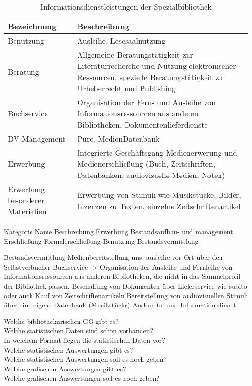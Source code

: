 \begin{table}[h]
    \centering
    \begin{adjustbox}{max width=\textwidth}
    \begin{tabular}{ll}
       \toprule
       \textbf{Bezeichnung}& \textbf{Beschreibung}\\
       \midrule
        Benutzung   &Ausleihe, Lesesaalnutzung\\
        Beratung    &Allgemeine Beratungstätigkeit zur Literaturrecherche und Nutzung elektronischer Ressourcen, spezielle Beratungstätigkeit zu   Urheberrecht und Publishing\\
        Buchservice &Organisation der Fern- und Ausleihe von Informationsressourcen aus anderen Bibliotheken, Dokumentenlieferdienste\\
        DV Management   &Pure, MedienDatenbank\\
        Erwerbung                           &Integrierte Geschäftsgang Medienerwerung und Medienerschließung (Buch, Zeitschriften, Datenbanken, audiovisuelle Medien, Noten)\\
        Erwerbung besonderer Materialien    &Erwerbung von Stimuli wie Musikstücke, Bilder, Lizenzen zu Texten, einzelne Zeitschriftenartikel\\
         
       \bottomrule
    \end{tabular}
    \end{adjustbox}
    \caption{%
        Informationsdienstleistungen der Spezialbibliothek
    }
    \label{tab:Informationsdienstleistungen}
    \end{table}

Kategorie           Name                                Beschreibung
Erwerbung           Bestandsaufbau- und management
Erschließung        Formalerschließung
Benutzung           Bestandsvermittlung


Bestandsvermittlung Medienbereitstellung uns -ausleihe vor Ort über den Selbstverbucher
Buchservice -> Organisation der Ausleihe und Fernleihe von Informationsressourcen aus anderen Bibliotheken, die nicht in das Sammelprofil der Bibliothek passen. 
    Beschaffung von Dokumenten über Lieferservice wie subito
    oder auch Kauf von Zeitschriftenartikeln
Bereitstellung von audiovisuellen Stimuli über eine eigene Datenbank (Musikstücke)
Auskunfts- und Informationsdienst



Welche bibliothekarischen GG gibt es?\\
Welche statistischen Daten sind schon vorhanden?\\
In welchem Format liegen die statistischen Daten vor?\\
Welche statistischen Auswertungen gibt es?\\
Welche statistischen Auswertungen soll es noch geben?\\
Welche grafischen Auswertungen gibt es?\\
Welche grafischen Auswertungen soll es noch geben?

